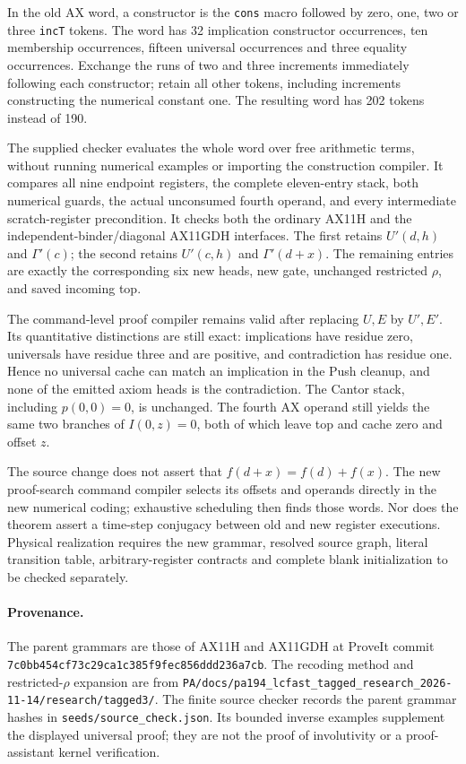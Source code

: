 In the old AX word, a constructor is the \texttt{cons} macro followed by
zero, one, two or three \texttt{incT} tokens.  The word has 32 implication
constructor occurrences, ten membership occurrences, fifteen universal
occurrences and three equality occurrences.  Exchange the runs of two and
three increments immediately following each constructor; retain all other
tokens, including increments constructing the numerical constant one.
The resulting word has 202 tokens instead of 190.

The supplied checker evaluates the whole word over free arithmetic terms,
without running numerical examples or importing the construction compiler.
It compares all nine endpoint registers, the complete eleven-entry stack,
both numerical guards, the actual unconsumed fourth operand, and every
intermediate scratch-register precondition.  It checks both the ordinary
AX11H and the independent-binder/diagonal AX11GDH interfaces.  The first
retains $U'(d,h)$ and $\Gamma'(c)$; the second retains $U'(c,h)$ and
$\Gamma'(d+x)$.  The remaining entries are exactly the corresponding six
new heads, new gate, unchanged restricted $\rho$, and saved incoming top.

The command-level proof compiler remains valid after replacing $U,E$ by
$U',E'$.  Its quantitative distinctions are still exact: implications
have residue zero, universals have residue three and are positive, and
contradiction has residue one.  Hence no universal cache can match an
implication in the Push cleanup, and none of the emitted axiom heads is
the contradiction.  The Cantor stack, including $p(0,0)=0$, is unchanged.
The fourth AX operand still yields the same two branches of $I(0,z)=0$,
both of which leave top and cache zero and offset $z$.

The source change does not assert that $f(d+x)=f(d)+f(x)$.  The new
proof-search command compiler selects its offsets and operands directly
in the new numerical coding; exhaustive scheduling then finds those words.
Nor does the theorem assert a time-step conjugacy between old and new
register executions.  Physical realization requires the new grammar,
resolved source graph, literal transition table, arbitrary-register
contracts and complete blank initialization to be checked separately.

\paragraph{Provenance.}
The parent grammars are those of AX11H and AX11GDH at ProveIt commit
\texttt{7c0bb454cf73c29ca1c385f9fec856ddd236a7cb}.  The recoding method and
restricted-$\rho$ expansion are from
\texttt{PA/docs/pa194\_lcfast\_tagged\_research\_2026-11-14/research/tagged3/}.
The finite source checker records the parent grammar hashes in
\texttt{seeds/source\_check.json}.  Its bounded inverse examples supplement
the displayed universal proof; they are not the proof of involutivity or
a proof-assistant kernel verification.
